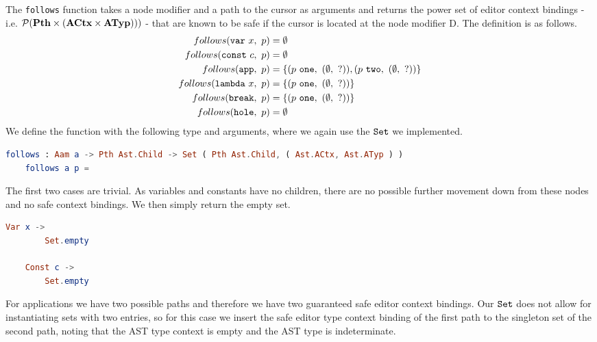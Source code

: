 The \texttt{follows} function takes a node modifier and a path to the cursor as
arguments and returns the power set of editor context bindings - i.e.
$\mathcal{P}(\textbf{Pth} \times (\textbf{ACtx} \times \textbf{ATyp})))$ - that are known to be safe if
the cursor is located at the node modifier D. The definition is as follows.
\begin{align*}
  follows(\texttt{var}~x,~p) &= \emptyset \\
  follows(\texttt{const}~c,~p) &= \emptyset \\
  follows(\texttt{app},~p) &= \{(p~\texttt{one},~(\emptyset,~?)), (p~\texttt{two},~(\emptyset,~?))\} \\
  follows(\texttt{lambda}~x,~p) &= \{(p~\texttt{one},~(\emptyset,~?))\} \\
  follows(\texttt{break},~p) &= \{(p~\texttt{one},~(\emptyset,~?))\} \\
  follows(\texttt{hole},~p) &= \emptyset
\end{align*}
We define the function with the following type and arguments, where we again use the $\texttt{Set}$ we implemented.
\begin{lstlisting}[language=elm,%
    gobble=4,%
    ]
    follows : Aam a -> Pth Ast.Child -> Set ( Pth Ast.Child, ( Ast.ACtx, Ast.ATyp ) )
    follows a p =
\end{lstlisting}
The first two cases are trivial. As variables and constants have no children,
there are no possible further movement down from these nodes and no safe
context bindings. We then simply return the empty set.
\begin{lstlisting}[language=elm,%
    gobble=4,%
    ]
    Var x ->
        Set.empty

    Const c ->
        Set.empty
\end{lstlisting}
For applications we have two possible paths and therefore we have two
guaranteed safe editor context bindings. Our $\texttt{Set}$ does not allow for
instantiating sets with two entries, so for this case we insert the safe editor
type context binding of the first path to the singleton set of the second path,
noting that the AST type context is empty and the AST type is indeterminate.

